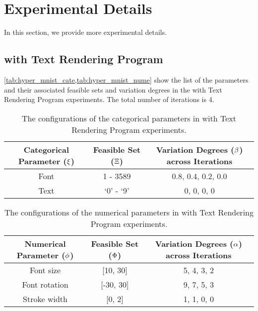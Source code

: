 \section{Experimental Details}

In this section, we provide more experimental details.

\subsection{\mnist{} with Text Rendering Program}

\cref{tab:hyper_mnist_cate,tab:hyper_mnist_nume} show the list of the parameters and their associated feasible sets and variation degrees in the \mnist{} with Text Rendering Program experiments. The total number of \pe{} iterations is 4.

\begin{table}[!h]
    \centering
    \caption{The configurations of the categorical parameters in \mnist{} with Text Rendering Program experiments.}
    \label{tab:hyper_mnist_cate}
    \begin{tabular}{c|c|c}
    \toprule
       Categorical Parameter ($\xi$)  & Feasible Set ($\Xi$)  & Variation Degrees ($\beta$) across \pe{} Iterations\\\midrule
       Font  & 1 - 3589 & 0.8, 0.4, 0.2, 0.0\\
       Text & `0' - `9' & 0, 0, 0, 0\\
         \bottomrule
    \end{tabular}
\end{table}

\begin{table}[!h]
    \centering
    \caption{The configurations of the numerical parameters in \mnist{} with Text Rendering Program experiments.}
    \label{tab:hyper_mnist_nume}
    \begin{tabular}{c|c|c}
    \toprule
       Numerical Parameter ($\phi$)  & Feasible Set ($\Phi$)  & Variation Degrees ($\alpha$) across \pe{} Iterations\\\midrule
       Font size  & [10, 30] & 5, 4, 3, 2\\
       Font rotation & [-30, 30] & 9, 7, 5, 3\\
       Stroke width & [0, 2] & 1, 1, 0, 0\\
         \bottomrule
    \end{tabular}
\end{table}



